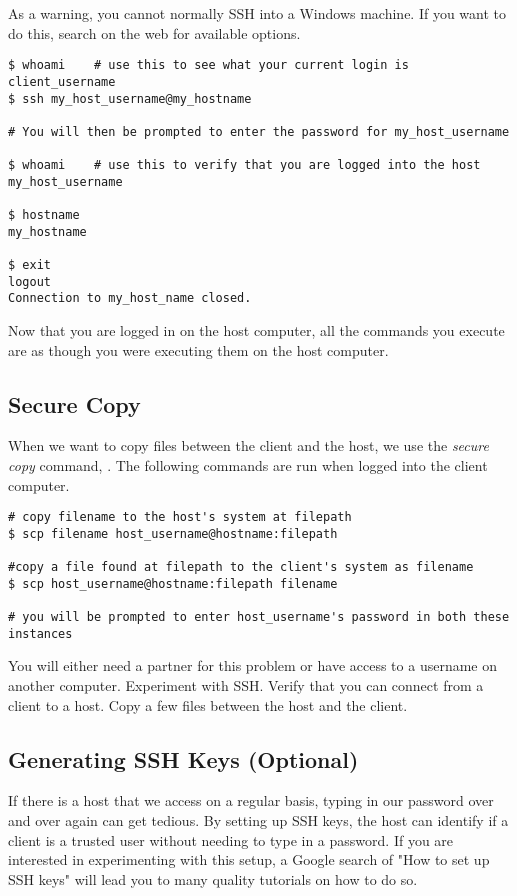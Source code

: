 As a warning, you cannot normally SSH into a Windows machine.
If you want to do this, search on the web for available options.

\begin{lstlisting}
$ whoami    # use this to see what your current login is
client_username
$ ssh my_host_username@my_hostname

# You will then be prompted to enter the password for my_host_username

$ whoami    # use this to verify that you are logged into the host
my_host_username

$ hostname
my_hostname

$ exit
logout
Connection to my_host_name closed.
\end{lstlisting}

Now that you are logged in on the host computer, all the commands you execute are as though you were executing them on the host computer.

\subsection*{Secure Copy}

When we want to copy files between the client and the host, we use the \emph{secure copy} command, .
The following commands are run when logged into the client computer.

\begin{lstlisting}
# copy filename to the host's system at filepath
$ scp filename host_username@hostname:filepath

#copy a file found at filepath to the client's system as filename
$ scp host_username@hostname:filepath filename

# you will be prompted to enter host_username's password in both these instances
\end{lstlisting}

\begin{problem}
You will either need a partner for this problem or have access to a username on another computer.
Experiment with SSH. Verify that you can connect from a client to a host.
Copy a few files between the host and the client.
\end{problem}

\subsection*{Generating SSH Keys (Optional)}
If there is a host that we access on a regular basis, typing in our password over and over again can get tedious.
By setting up SSH keys, the host can identify if a client is a trusted user without needing to type in a password.
If you are interested in experimenting with this setup, a Google search of "How to set up SSH keys" will lead you to many quality tutorials on how to do so.


